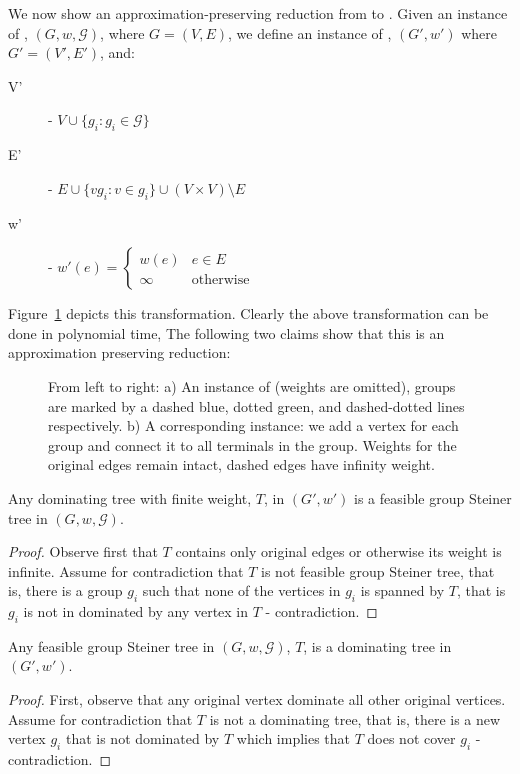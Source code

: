 We now show an approximation-preserving reduction from \ProbGroup{} to
\Prob{}.
Given an instance of \ProbGroup{}, $(G, w, \mathcal{G})$, where $G = (V, E)$, 
we define an instance of \Prob{},
$(G', w')$ where $G' = (V', E')$, and:
\begin{description}
\item[V'] - $V \cup \{g_i : g_i \in \mathcal{G}\}$
\item[E'] - $E \cup \{vg_i : v \in g_i\} \cup (V \times V) \setminus E$
\item[w'] - $
w'(e) = 
\begin{cases}
w(e) 	& e \in E
\\
\infty & \text{otherwise}
\end{cases}
$
\end{description}
Figure~\ref{fig:prob-geq-group} depicts this transformation.
Clearly the above transformation can be done in polynomial time,
The following two claims show that this is an approximation preserving reduction:

\begin{figure}
\begin{center}
\scalebox{.65}{

}
\end{center}
\caption{\label{fig:prob-geq-group}
From left to right:
a) An instance of \ProbGroup{} (weights are omitted), 
groups are marked by a dashed blue, dotted green, and dashed-dotted lines respectively.  
b) A corresponding \Prob{} instance: we add a vertex for each group and connect it 
to all terminals in the group.
Weights for the original edges remain intact, dashed edges have infinity weight.   
}
\end{figure}

\begin{claim}
Any dominating tree with finite weight, $T$, in $(G', w')$ is a feasible group Steiner tree in 
$(G, w, \mathcal{G})$.
\end{claim}

\begin{proof}
Observe first that $T$ contains only original edges or otherwise its weight is infinite.  
Assume for contradiction that $T$ is not feasible group Steiner tree, that is, there is 
a group $g_i$ such that none of the vertices in $g_i$ is spanned by $T$, that is $g_i$
is not in dominated by any vertex in $T$ - contradiction. 
\end{proof}
 
\begin{claim}
Any feasible group Steiner tree in $(G, w, \mathcal{G})$, $T$, is a dominating tree
in $(G', w')$.
\end{claim}

\begin{proof}
First, observe that any original vertex dominate all other original vertices.
Assume for contradiction that $T$ is not a dominating tree, that is, there is 
a new vertex $g_i$ that is not dominated by $T$ which implies that 
$T$ does not cover $g_i$ - contradiction. 
\end{proof}